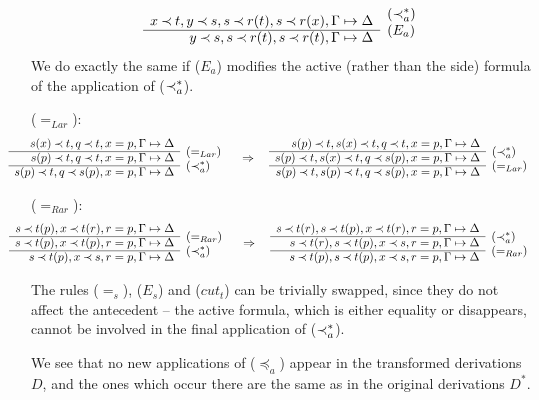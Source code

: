 \begin{PROOF}
\begin{LS}
\[\begin{array}{rl}
x\Incl t, y\Incl s, s\Incl r(t), s\Incl r(x),\GSD  & \rabove{(\Incl_a^*)} \\ \cline{1-1}
          y\Incl s, s\Incl r(t), s\Incl r(t),\GSD  & \rabove{(E_a)} \end{array} \]
%
We do exactly the same if ($E_a$) modifies the active (rather than the side)
formula of the application of ($\mathbin{\prec}_a^*$).
\item ($=_{Lar}$): 
\[ \hspace*{-2em}\begin{array}{rl}
s(x)\Incl t, q\Incl t, x=p, \GSD \\ \cline{1-1}
s(p)\Incl t, q\Incl t, x=p, \GSD & \rabove{(=_{Lar})} \\ \cline{1-1}
s(p)\Incl t, q\Incl s(p), x=p, \GSD & \rabove{(\Incl_a^*)} \end{array} \conv
\begin{array}{rl}
s(p)\Incl t,s(x)\Incl t, q\Incl t, x=p, \GSD \\ \cline{1-1}
s(p)\Incl t,s(x)\Incl t, q\Incl s(p), x=p, \GSD & \rabove{(\Incl_a^*)} \\ \cline{1-1}
s(p)\Incl t,s(p)\Incl t, q\Incl s(p), x=p, \GSD & \rabove{(=_{Lar})} \end{array}
\]
\item ($=_{Rar}$):
\[ \hspace*{-2em} \begin{array}{rl}
s\Incl t(p), x\Incl t(r), r=p, \GSD \\ \cline{1-1}
s\Incl t(p), x\Incl t(p), r=p, \GSD & \rabove{(=_{Rar})}\\ \cline{1-1}
s\Incl t(p), x\Incl s, r=p, \GSD & \rabove{(\Incl_a^*)} \end{array} \conv
 \begin{array}{rl}
s\Incl t(r), s\Incl t(p), x\Incl t(r), r=p, \GSD \\ \cline{1-1}
s\Incl t(r), s\Incl t(p), x\Incl s, r=p, \GSD & \rabove{(\Incl_a^*)} \\ \cline{1-1}
s\Incl t(p), s\Incl t(p), x\Incl s, r=p, \GSD & \rabove{(=_{Rar})} \end{array} \]
%
\item The rules ($=_s$), ($E_s$) and ($cut_t$) can be trivially swapped, since they do
not affect the antecedent -- the active formula, which is either equality or
disappears, cannot be involved in the final application of ($\mathbin{\prec}_a^*$).
\end{LS}
We see that no new applications of ($\preceq_a$) appear in the transformed derivations 
$D$, and the ones which occur there are the same as in the original derivations $D^*$.
\end{PROOF}
